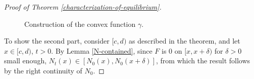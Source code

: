 \documentclass[11pt]{article}
\numberwithin{equation}{section}
\begin{document}
\begin{proof}[Proof of Theorem \ref{characterization-of-equilibrium}]
\begin{figure}
    \caption{Construction of the convex function $\gamma$.}
    \label{gamma-construction}
\end{figure}   

To show the second part, consider $[c,d)$ as described in the theorem, and let $x\in[c, d)$, $t>0$. By Lemma \ref{N-contained}, since $F$ is $0$ on $[x,x+\delta)$ for $\delta>0$ small enough, $N_t(x)\in[N_0(x), N_0(x+\delta)]$, from which the result follows by the right continuity of $N_0$. 
\end{proof}
\end{document}
